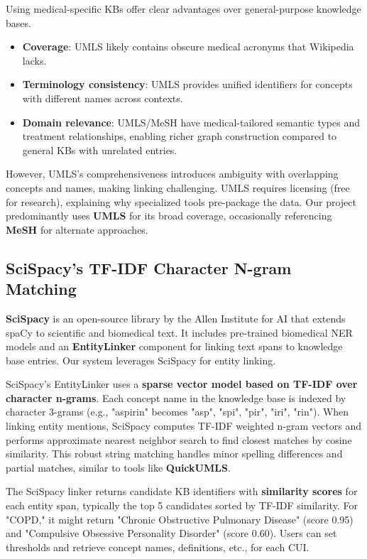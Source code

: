 Using medical-specific KBs offer clear advantages over general-purpose knowledge bases.

\begin{itemize}

  \item \textbf{Coverage}: UMLS likely contains obscure medical acronyms that Wikipedia lacks.

  \item \textbf{Terminology consistency}: UMLS provides unified identifiers for concepts with different names across contexts.

  \item \textbf{Domain relevance}: UMLS/MeSH have medical-tailored semantic types and treatment relationships, enabling richer graph construction compared to general KBs with unrelated entries.
\end{itemize}

However, UMLS's comprehensiveness introduces ambiguity with overlapping concepts and names, making linking challenging. UMLS requires licensing (free for research), explaining why specialized tools pre-package the data. Our project predominantly uses \textbf{UMLS} for its broad coverage, occasionally referencing \textbf{MeSH} for alternate approaches.

\subsection{SciSpacy's TF-IDF Character N-gram Matching}

\textbf{SciSpacy} \parencite{Neumann2019} is an open-source library by the Allen Institute for AI that extends spaCy to scientific and biomedical text. It includes pre-trained biomedical NER models and an \textbf{EntityLinker} component for linking text spans to knowledge base entries. Our system leverages SciSpacy for entity linking.

SciSpacy's EntityLinker uses a \textbf{sparse vector model based on TF-IDF over character n-grams}. Each concept name in the knowledge base is indexed by character 3-grams (e.g., "aspirin" becomes "asp", "spi", "pir", "iri", "rin"). When linking entity mentions, SciSpacy computes TF-IDF weighted n-gram vectors and performs approximate nearest neighbor search to find closest matches by cosine similarity. This robust string matching handles minor spelling differences and partial matches, similar to tools like \textbf{QuickUMLS}.

The SciSpacy linker returns candidate KB identifiers with \textbf{similarity scores} for each entity span, typically the top 5 candidates sorted by TF-IDF similarity. For "COPD," it might return "Chronic Obstructive Pulmonary Disease" (score 0.95) and "Compulsive Obsessive Personality Disorder" (score 0.60). Users can set thresholds and retrieve concept names, definitions, etc., for each CUI.

